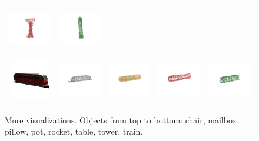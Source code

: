 \documentclass[bachelor, nocolorlinks, printoneside]{seuthesis} %
\begin{document}
\begin{Appendix}{}
\begin{figure}[!h]
\begin{tabular}{c@{}c@{}c@{}c@{}c@{}}
            \includegraphics[width=0.22\columnwidth,height=2cm]{figs/supp_real_dataset/AE/tower_f584f1a14904b958ba9419f3b43eb3bd_pred.png} &
            \includegraphics[width=0.22\columnwidth,height=2cm]{figs/supp_real_dataset/oracle/tower_f584f1a14904b958ba9419f3b43eb3bd_oracle.png} \\
            \vspace{-5mm}
            \includegraphics[width=0.11\columnwidth,height=1.7cm]{figs/supp_real_dataset/Image/train_537decdce3079c857addcf2661f94d39.png} &
            \includegraphics[width=0.22\columnwidth,height=2cm]{figs/supp_real_dataset/GT/train_537decdce3079c857addcf2661f94d39_gt.png} &
            \includegraphics[width=0.22\columnwidth,height=2cm]{figs/supp_real_dataset/AE_label/train_537decdce3079c857addcf2661f94d39_label.png} &
            \includegraphics[width=0.22\columnwidth,height=2cm]{figs/supp_real_dataset/AE/train_537decdce3079c857addcf2661f94d39_pred.png} &
            \includegraphics[width=0.22\columnwidth,height=2cm]{figs/supp_real_dataset/oracle/train_537decdce3079c857addcf2661f94d39_oracle.png} \\
            \end{tabular}
            \caption{\small More visualizations. Objects from top to bottom: chair, mailbox, pillow, pot, rocket, table, tower, train.}
            \label{fig:visualize_KC_supplementary}
        \end{figure}
        \clearpage


\end{Appendix}
\end{document}
